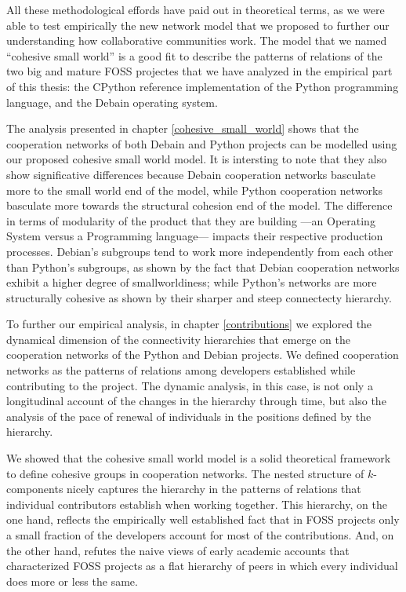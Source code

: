 All these methodological effords have paid out in theoretical terms, as we were able to test empirically the new network model that we proposed to further our understanding how collaborative communities work. The model that we named ``cohesive small world'' is a good fit to describe the patterns of relations of the two big and mature FOSS projectes that we have analyzed in the empirical part of this thesis: the CPython reference implementation of the Python programming language, and the Debain operating system.

The analysis presented in chapter \ref{cohesive_small_world} shows that the cooperation networks of both Debain and Python projects can be modelled using our proposed cohesive small world model. It is intersting to note that they also show significative differences because Debain cooperation networks basculate more to the small world end of the model, while Python cooperation networks basculate more towards the structural cohesion end of the model. The difference in terms of modularity of the product that they are building ---an Operating System versus a Programming language--- impacts their respective production processes. Debian's subgroups tend to work more independently from each other than Python's subgroups, as shown by the fact that Debian cooperation networks exhibit a higher degree of smallworldiness; while Python's networks are more structurally cohesive as shown by their sharper and steep connectecty hierarchy.

To further our empirical analysis, in chapter \ref{contributions} we explored the dynamical dimension of the connectivity hierarchies that emerge on the cooperation networks of the Python and Debian projects. We defined cooperation networks as the patterns of relations among developers established while contributing to the project. The dynamic analysis, in this case, is not only a longitudinal account of the changes in the hierarchy through time, but also the analysis of the pace of renewal of individuals in the positions defined by the hierarchy.

We showed that the cohesive small world model is a solid theoretical framework to define cohesive groups in cooperation networks. The nested structure of $k$-components nicely captures the hierarchy in the patterns of relations that individual contributors establish when working together. This hierarchy, on the one hand, reflects the empirically well established fact that in FOSS projects only a small fraction of the developers account for most of the contributions. And, on the other hand, refutes the naive views of early academic accounts that characterized FOSS projects as a flat hierarchy of peers in which every individual does more or less the same.

